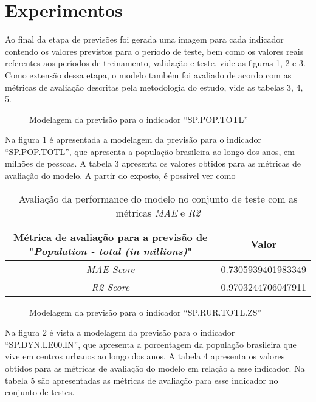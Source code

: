 \section{Experimentos}

Ao final da etapa de previsões foi gerada uma imagem para 
cada indicador contendo os valores previstos para o período 
de teste, bem como os valores reais referentes aos períodos de 
treinamento, validação e teste, vide as figuras 1, 2 e 3.  
Como extensão dessa etapa, o modelo também foi avaliado de acordo 
com as métricas de avaliação descritas pela metodologia do estudo, 
vide as tabelas 3, 4, 5.

\begin{figure}[h]
    \caption{Modelagem da previsão para o indicador “SP.POP.TOTL”}
\end{figure}

Na figura 1 é apresentada a modelagem da previsão para o indicador “SP.POP.TOTL”, 
que apresenta a população brasileira ao longo dos anos, em milhões de pessoas. 
A tabela 3 apresenta os valores obtidos para as métricas de avaliação do modelo. 
A partir do exposto, é possível ver como

\begin{table}[h]
    \centering
    \begin{tabular}{|c|c|}
        \hline
        \multicolumn{1}{|p{5cm}|}{Métrica de avaliação para a previsão de "\emph{Population - total (in millions)}"} & Valor \\
        \hline 
        \emph{MAE Score} & 0.7305939401983349 \\
        \hline
        \emph{R2 Score} &  0.9703244706047911 \\
        \hline
    \end{tabular}
    \caption{Avaliação da performance do modelo no conjunto de teste com as métricas \emph{MAE} e \emph{R2}}
\end{table}

\begin{figure}[h]
    \caption{Modelagem da previsão para o indicador “SP.RUR.TOTL.ZS”}
\end{figure}

Na figura 2 é vista a modelagem da previsão para o indicador “SP.DYN.LE00.IN”, 
que apresenta a porcentagem da população brasileira que vive em centros urbanos 
ao longo dos anos. A tabela 4 apresenta os valores obtidos para as métricas de 
avaliação do modelo em relação a esse indicador. Na tabela 5 são apresentadas 
as métricas de avaliação para esse indicador no conjunto de testes.

